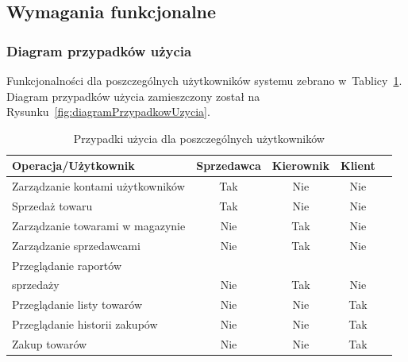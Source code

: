 \documentclass[a4paper, 12pt]{article}
\begin{document}
\subsection{Wymagania funkcjonalne}
\subsubsection{Diagram przypadków użycia}
Funkcjonalności dla poszczególnych użytkowników systemu zebrano w~Tablicy~\ref{tab:tabelaPrzypadkowUzycia}.
Diagram przypadków użycia zamieszczony został na Rysunku~\ref{fig:diagramPrzypadkowUzycia}.

\begin{table}[H]
	\centering
	\caption[Tabela przypadków użycia]{Przypadki użycia dla poszczególnych użytkowników}
	\label{tab:tabelaPrzypadkowUzycia}
		\begin{tabular}{ l c c c c }
			Operacja/Użytkownik & Sprzedawca & Kierownik & Klient \\ \hline
			Zarządzanie kontami użytkowników & Tak & Nie & Nie \\ \hline
			Sprzedaż towaru & Tak & Nie & Nie \\ \hline
			Zarządzanie towarami w magazynie & Nie & Tak & Nie \\ \hline
			Zarządzanie sprzedawcami & Nie & Tak & Nie \\ \hline
			Przeglądanie raportów\\ sprzedaży & Nie & Tak & Nie \\ \hline
			Przeglądanie listy towarów & Nie & Nie & Tak \\ \hline
			Przeglądanie historii zakupów & Nie & Nie & Tak \\ \hline
			Zakup towarów & Nie & Nie & Tak \\ \hline
		\end{tabular}
\end{table}
\end{document}
